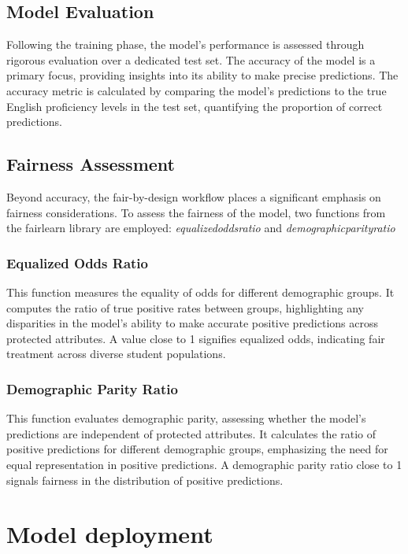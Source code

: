 \documentclass[12pt,a4paper,openright,twoside]{book}
\begin{document}
\subsection{Model Evaluation}

Following the training phase, the model's performance is assessed through rigorous evaluation over a dedicated test set. The accuracy of the model is a primary focus, providing insights into its ability to make precise predictions. The accuracy metric is calculated by comparing the model's predictions to the true English proficiency levels in the test set, quantifying the proportion of correct predictions.

\subsection{Fairness Assessment}

Beyond accuracy, the fair-by-design workflow places a significant emphasis on fairness considerations. To assess the fairness of the model, two functions from the fairlearn library are employed: \emph{equalized\textunderscore odds\textunderscore ratio} and \emph{demographic\textunderscore parity\textunderscore ratio}

\subsubsection{Equalized Odds Ratio}

This function measures the equality of odds for different demographic groups. It computes the ratio of true positive rates between groups, highlighting any disparities in the model's ability to make accurate positive predictions across protected attributes. A value close to 1 signifies equalized odds, indicating fair treatment across diverse student populations.

\subsubsection{Demographic Parity Ratio}

This function evaluates demographic parity, assessing whether the model's predictions are independent of protected attributes. It calculates the ratio of positive predictions for different demographic groups, emphasizing the need for equal representation in positive predictions. A demographic parity ratio close to 1 signals fairness in the distribution of positive predictions.

\section{Model deployment}
\label{section:model-deployment}
\end{document}
